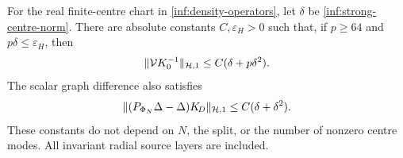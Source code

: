 \begin{proposition}
\label{inf:Hilbert-relative}
For the real finite-centre chart in \eqref{inf:density-operators},
let $\delta$ be \eqref{inf:strong-centre-norm}. There are absolute
constants $C,\varepsilon_H>0$ such that, if $p\ge64$ and
$p\delta\le\varepsilon_H$, then
\begin{equation}\label{inf:Hilbert-relative-bound}
 \lVert \mathcal VK_0^{-1}\rVert_{\mathcal{H},1}
 \le C(\delta+p\delta^2).
\end{equation}
The scalar graph difference also satisfies
\begin{equation}\label{inf:Hilbert-scalar-bound}
 \lVert (P_{\Phi_N}\Delta-\Delta)K_{\!D}\rVert_{\mathcal{H},1}
 \le C(\delta+\delta^2).
\end{equation}
These constants do not depend on $N$, the split, or the number
of nonzero centre modes. All invariant radial source layers
are included.
\end{proposition}
